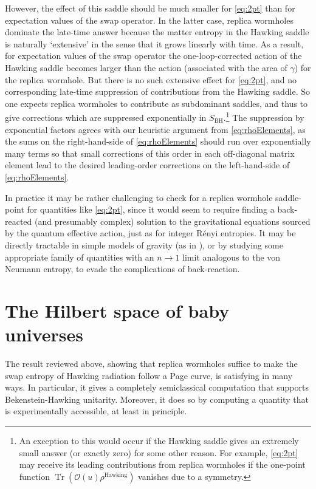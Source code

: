 \documentclass[letterpaper,12pt]{article}
\DeclareMathOperator{\Tr}{Tr}
\begin{document}
However, the effect of this saddle should be much smaller for \eqref{eq:2pt} than for  expectation values of the swap operator.  In the latter case, replica wormholes dominate the late-time answer because the matter entropy in the Hawking saddle is naturally `extensive' in the sense that it grows linearly with time.  As a result, for  expectation values of the swap operator the one-loop-corrected action of the Hawking saddle becomes larger than the action (associated with the area of $\gamma$) for the replica wormhole.  But there is no such extensive effect for \eqref{eq:2pt}, and no corresponding late-time suppression of contributions from the Hawking saddle.  So one expects replica wormholes to contribute as subdominant saddles, and thus to give corrections which are suppressed exponentially in $S_\mathrm{BH}$.\footnote{An exception to this would occur if the Hawking saddle gives an extremely small answer (or exactly zero) for some other reason. For example, \eqref{eq:2pt} may receive its leading contributions from replica wormholes if the one-point function $\Tr(\mathcal{O}(u)\rho^\mathrm{Hawking})$ vanishes due to a symmetry.} The suppression by exponential factors agrees with our heuristic argument from \eqref{eq:rhoElements}, as the sums on the right-hand-side of \eqref{eq:rhoElements} should run over exponentially many terms so that small corrections of this order in each off-diagonal matrix element lead to the desired leading-order corrections on the left-hand-side of \eqref{eq:rhoElements}.

In practice it may be rather challenging to check for a replica wormhole saddle-point for quantities like \eqref{eq:2pt}, since it would seem to require finding a  back-reacted (and presumably complex) solution to the gravitational equations sourced by the quantum effective action, just as for integer R\'enyi entropies. It may be directly tractable in simple models of gravity (as in \cite{Stanford:2020wkf}), or by studying some appropriate family of quantities with an $n\to 1$ limit analogous to the von Neumann entropy, to evade the complications of back-reaction.


\section{The Hilbert space of baby universes}
\label{sec:BUetc}

The result reviewed above, showing that replica wormholes suffice to make the swap entropy of Hawking radiation follow a Page curve, is satisfying in many ways.  In particular, it gives a completely semiclassical computation that supports Bekenstein-Hawking unitarity.  Moreover, it does so by computing a quantity that is experimentally accessible, at least in principle.
\end{document}
